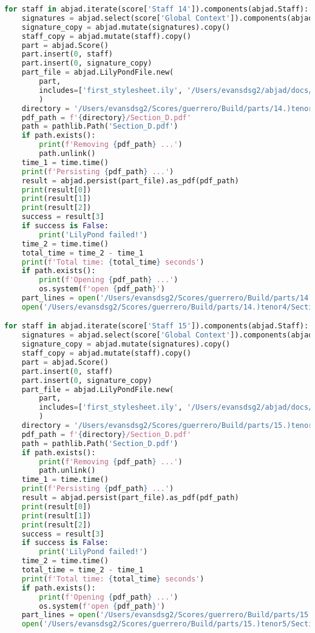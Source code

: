 \begin{lstlisting}[language=Python, caption=Invocation Source Code]
for staff in abjad.iterate(score['Staff 14']).components(abjad.Staff):
    signatures = abjad.select(score['Global Context']).components(abjad.Staff)
    signature_copy = abjad.mutate(signatures).copy()
    staff_copy = abjad.mutate(staff).copy()
    part = abjad.Score()
    part.insert(0, staff)
    part.insert(0, signature_copy)
    part_file = abjad.LilyPondFile.new(
        part,
        includes=['first_stylesheet.ily', '/Users/evansdsg2/abjad/docs/source/_stylesheets/abjad.ily'],
        )
    directory = '/Users/evansdsg2/Scores/guerrero/Build/parts/14.)tenor4'
    pdf_path = f'{directory}/Section_D.pdf'
    path = pathlib.Path('Section_D.pdf')
    if path.exists():
        print(f'Removing {pdf_path} ...')
        path.unlink()
    time_1 = time.time()
    print(f'Persisting {pdf_path} ...')
    result = abjad.persist(part_file).as_pdf(pdf_path)
    print(result[0])
    print(result[1])
    print(result[2])
    success = result[3]
    if success is False:
        print('LilyPond failed!')
    time_2 = time.time()
    total_time = time_2 - time_1
    print(f'Total time: {total_time} seconds')
    if path.exists():
        print(f'Opening {pdf_path} ...')
        os.system(f'open {pdf_path}')
    part_lines = open('/Users/evansdsg2/Scores/guerrero/Build/parts/14.)tenor4/Section_D.ly').readlines()
    open('/Users/evansdsg2/Scores/guerrero/Build/parts/14.)tenor4/Section_D.ly', 'w').writelines(part_lines[15:-1])

for staff in abjad.iterate(score['Staff 15']).components(abjad.Staff):
    signatures = abjad.select(score['Global Context']).components(abjad.Staff)
    signature_copy = abjad.mutate(signatures).copy()
    staff_copy = abjad.mutate(staff).copy()
    part = abjad.Score()
    part.insert(0, staff)
    part.insert(0, signature_copy)
    part_file = abjad.LilyPondFile.new(
        part,
        includes=['first_stylesheet.ily', '/Users/evansdsg2/abjad/docs/source/_stylesheets/abjad.ily'],
        )
    directory = '/Users/evansdsg2/Scores/guerrero/Build/parts/15.)tenor5'
    pdf_path = f'{directory}/Section_D.pdf'
    path = pathlib.Path('Section_D.pdf')
    if path.exists():
        print(f'Removing {pdf_path} ...')
        path.unlink()
    time_1 = time.time()
    print(f'Persisting {pdf_path} ...')
    result = abjad.persist(part_file).as_pdf(pdf_path)
    print(result[0])
    print(result[1])
    print(result[2])
    success = result[3]
    if success is False:
        print('LilyPond failed!')
    time_2 = time.time()
    total_time = time_2 - time_1
    print(f'Total time: {total_time} seconds')
    if path.exists():
        print(f'Opening {pdf_path} ...')
        os.system(f'open {pdf_path}')
    part_lines = open('/Users/evansdsg2/Scores/guerrero/Build/parts/15.)tenor5/Section_D.ly').readlines()
    open('/Users/evansdsg2/Scores/guerrero/Build/parts/15.)tenor5/Section_D.ly', 'w').writelines(part_lines[15:-1])


\end{lstlisting}
